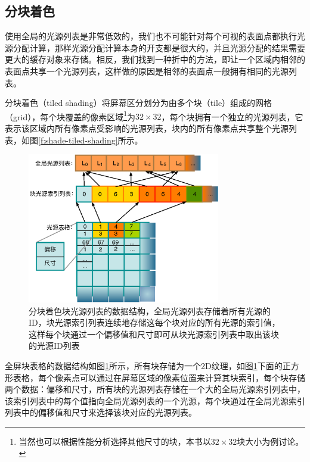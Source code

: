 \subsection{分块着色}\label{sec:shade-tiled-shading}
使用全局的光源列表是非常低效的，我们也不可能针对每个可视的表面点都执行光源分配计算，那样光源分配计算本身的开支都是很大的，并且光源分配的结果需要更大的缓存对象来存储。相反，我们找到一种折中的方法，即让一个区域内相邻的表面点共享一个光源列表，这样做的原因是相邻的表面点一般拥有相同的光源列表。

分块着色（tiled shading）将屏幕区分划分为由多个块（tile）组成的网格（grid），每个块覆盖的像素区域\footnote{当然也可以根据性能分析选择其他尺寸的块，本书以$32\times 32$块大小为例讨论。}为$32\times 32$，每个块拥有一个独立的光源列表，它表示该区域内所有像素点受影响的光源列表，块内的所有像素点共享整个光源列表，如图\ref{f:shade-tiled-shading}所示。

\begin{figure}
\begin{center}
	\includegraphics[width=0.75\textwidth]{figures/shade/tile-grid}
\end{center}
	\caption{分块着色块光源列表的数据结构，全局光源列表存储着所有光源的ID，块光源索引列表连续地存储这每个块对应的所有光源的索引值，这样每个块通过一个偏移值和尺寸即可从块光源索引列表中取出该块的光源ID列表}
	\label{f:shade-tiled-grid}
\end{figure}

全屏块表格的数据结构如图\ref{f:shade-tiled-grid}所示，所有块存储为一个2D纹理，如图\ref{f:shade-tiled-grid}下面的正方形表格，每个像素点可以通过在屏幕区域的像素位置来计算其块索引，每个块存储两个数据：偏移和尺寸，所有块的光源列表存储在一个大的全局光源索引列表中，该索引列表中的每个值指向全局光源列表的一个光源，每个块通过在全局光源索引列表中的偏移值和尺寸来选择该块对应的光源列表。

